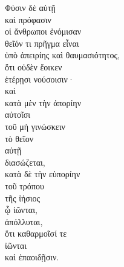 {\large
\begin{greek}
\noindent Φύσιν δὲ αὐτῇ \\
καὶ πρόφασιν \\
οἱ ἄνθρωποι ἐνόμισαν \\
\tabto{2em} θεῖόν τι πρῆγμα εἶναι \\
ὑπὸ ἀπειρίης καὶ θαυμασιότητος, \\
ὅτι οὐδὲν ἔοικεν \\
\tabto{2em} ἑτέρῃσι νούσοισιν· \\
καὶ \\
κατὰ μὲν τὴν ἀπορίην \\
αὐτοῖσι \\
\tabto{2em} τοῦ μὴ γινώσκειν \\
τὸ θεῖον \\
\tabto{2em} αὐτῇ \\
\tabto{2em} \tabto{2em} διασώζεται, \\
κατὰ δὲ τὴν εὐπορίην \\
\tabto{2em} τοῦ τρόπου \\
\tabto{2em} \tabto{2em} τῆς ἰήσιος \\
\tabto{2em} ᾧ ἰῶνται, \\
ἀπόλλυται,\\
ὅτι καθαρμοῖσί τε \\
\tabto{2em} ἰῶνται \\
καὶ ἐπαοιδῇσιν.\\

\end{greek}
}


